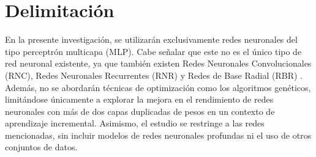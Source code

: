 \section{Delimitación}
\label{sec:delimitation}

En la presente investigación, se utilizarán exclusivamente redes neuronales del tipo perceptrón multicapa (MLP). Cabe señalar que este no es el único tipo de red neuronal existente, ya que también existen Redes Neuronales Convolucionales (RNC), Redes Neuronales Recurrentes (RNR) y Redes de Base Radial (RBR) \cite{royo2021}. Además, no se abordarán técnicas de optimización como los algoritmos genéticos, limitándose únicamente a explorar la mejora en el rendimiento de redes neuronales con más de dos capas duplicadas de pesos en un contexto de aprendizaje incremental. Asimismo, el estudio se restringe a las redes mencionadas, sin incluir modelos de redes neuronales profundas ni el uso de otros conjuntos de datos.



